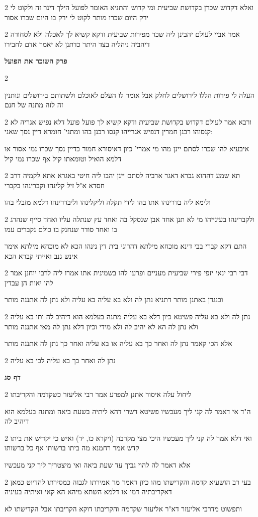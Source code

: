 \documentclass[12pt, openany]{book}
\newcommand{\sethebfont}{
\fontsize{10.5pt}{21.0pt} \selectfont
}
\newcommand{\twocol}[1]{
	{\sethebfont \begin{multicols}{2}
			#1
	\end{multicols}}	
}
\newcommand{\chapname}{}
\newcommand{\sectname}{}
\newcommand{\newchap}[1]{
	\addcontentsline{toc}{chapter}{#1}
	\renewcommand{\chapname}{#1}
		\begin{center}
			\textbf{%
\fontsize{16pt}{16pt}\selectfont
				#1}
		\end{center}
}
\newcommand{\newsection}[1]{
	\addcontentsline{toc}{section}{#1}
	\renewcommand{\sectname}{#1}	
	\vspace{-\baselineskip}
	\begin{center}
		\textbf{%
\fontsize{16pt}{16pt}\selectfont
			#1}
	\end{center}
	\vspace{-\baselineskip}
	\nopagebreak
}
\begin{document}
\twocol{ואלא דקדוש שכרן בקדושת שביעית ומי קדוש והתניא האומר לפועל הילך דינר זה ולקוט לי ירק היום שכרו מותר לקוט לי ירק בו היום שכרו אסור
\par }
\twocol{אמר אביי לעולם יהבינן ליה שכר מפירות שביעית ודקא קשיא לך לאכלה ולא לסחורה דיהביה ניהליה בצד היתר כדתנן לא יאמר אדם לחבירו}
\newchap{פרק \quad השוכר את הפועל}
\twocol{
\par העלה לי פירות הללו לירושלים לחלק אבל אומר לו העלם לאוכלם ולשתותם בירושלים ונותנין זה לזה מתנה של חנם}
\twocol{ורבא אמר לעולם דקדוש בקדושת שביעית ודקא קשיא לך פועל פועל דלא נפיש אגריה לא קנסוהו רבנן חמרין דנפיש אגרייהו קנסו רבנן בהו ומתני' חומרא דיין נסך שאני:
\par איבעיא להו שכרו לסתם יינן מהו מי אמרי' כיון דאיסורא חמור כדיין נסך שכרו נמי אסור או דלמא הואיל וטומאתו קיל אף שכרו נמי קיל}
\twocol{תא שמע דההוא גברא דאגר ארביה לסתם יינן יהבו ליה חיטי באגרא אתא לקמיה דרב חסדא א"ל זיל קלינהו וקברינהו בקברי
\par ולימא ליה בדרינהו אתו בהו לידי תקלה וליקלינהו וליבדרינהו דלמא מזבלי בהו}
\twocol{ולקברינהו בעינייהו מי לא תנן אחד אבן שנסקל בה ואחד עץ שנתלה עליו ואחד סייף שנהרג בו ואחד סודר שנחנק בו כולם נקברים עמו
\par התם דקא קברי בבי דינא מוכחא מילתא דהרוגי בית דין נינהו הכא לא מוכחא מילתא אימר אינש גנב ואייתי קברא הכא}
\twocol{דבי רבי ינאי יזפי פירי שביעית מעניים ופרעו להו בשמינית אתו אמרו ליה לרבי יוחנן אמר להו יאות הן עבדין
\par וכנגדן באתנן מותר דתניא נתן לה ולא בא עליה בא עליה ולא נתן לה אתננה מותר}
\twocol{נתן לה ולא בא עליה פשיטא כיון דלא בא עליה מתנה בעלמא הוא דיהיב לה ותו בא עליה ולא נתן לה הא לא יהיב לה ולא מידי וכיון דלא נתן לה מאי אתננה מותר
\par אלא הכי קאמר נתן לה ואחר כך בא עליה או בא עליה ואחר כך נתן לה אתננה מותר}
\twocol{נתן לה ואחר כך בא עליה לכי בא עליה}
\newsection{דף סג}
\twocol{ליחול עלה איסור אתנן למפרע אמר רבי אליעזר כשקדמה והקריבתו
\par ה"ד אי דאמר לה קני ליך מעכשיו פשיטא דשרי דהא ליתיה בשעת ביאה ומתנה בעלמא הוא דיהיב לה}
\twocol{ואי דלא אמר לה קני ליך מעכשיו היכי מצי מקרבה (ויקרא כז, יד) ואיש כי יקדיש את ביתו קדש אמר רחמנא מה ביתו ברשותו אף כל ברשותו
\par אלא דאמר לה להוי גביך עד שעת ביאה ואי מיצטריך ליך קני מעכשיו}
\twocol{בעי רב הושעיא קדמה והקדישתו מהו כיון דאמר מר אמירתו לגבוה כמסירתו להדיוט כמאן דאקריבתיה דמי או דלמא השתא מיהא הא קאי ואיתיה בעיניה
\par ותפשוט מדרבי אליעזר דא"ר אליעזר שקדמה והקריבתו דוקא הקריבתו אבל הקדישתו לא}
\end{document}
